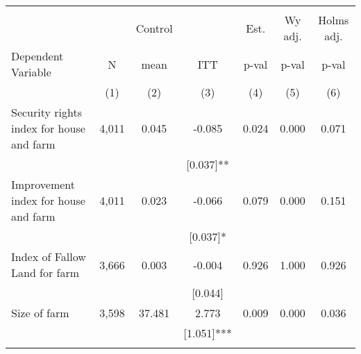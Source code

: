 \begin{tabular}{lcccccc}
\hline \noalign{\smallskip} &  &  &  &  &  & \\
 &  & Control &  & Est. & Wy adj. & Holms adj.\\
Dependent Variable & N & mean & ITT & p-val & p-val & p-val\\
 & (1) & (2) & (3) & (4) & (5) & (6)\\
\noalign{\smallskip}\hline \noalign{\smallskip}Security rights index for house and farm & 4,011 & 0.045 & -0.085 & 0.024 & 0.000 & 0.071\\
 &  &  & [0.037]** &  &  & \\
Improvement index for house and farm & 4,011 & 0.023 & -0.066 & 0.079 & 0.000 & 0.151\\
 &  &  & [0.037]* &  &  & \\
Index of Fallow Land for farm & 3,666 & 0.003 & -0.004 & 0.926 & 1.000 & 0.926\\
 &  &  & [0.044] &  &  & \\
Size of farm & 3,598 & 37.481 & 2.773 & 0.009 & 0.000 & 0.036\\
 &  &  & [1.051]*** &  &  & \\
\noalign{\smallskip}\hline\end{tabular}
